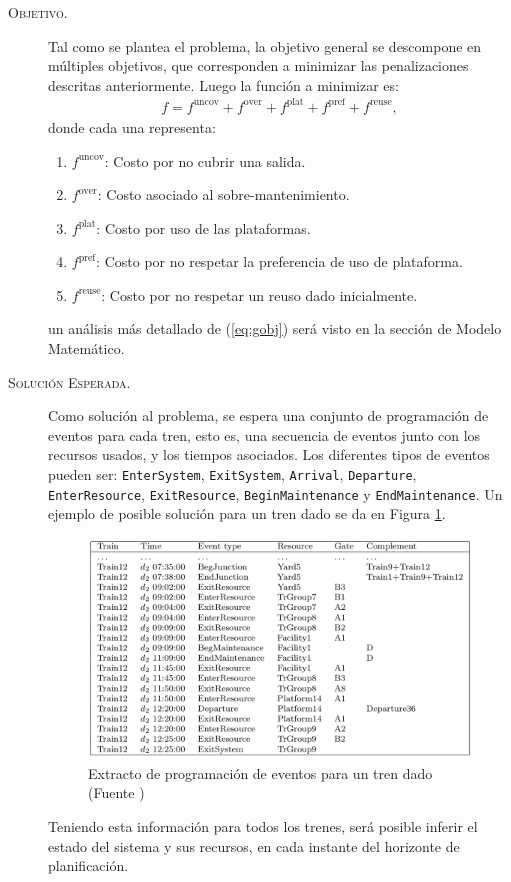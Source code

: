 \documentclass[letter, 10pt]{article}
\begin{document}
\begin{description}
    \item[\textsc{Objetivo.}] Tal como se plantea el problema, la objetivo general se descompone en múltiples objetivos,
    que corresponden a minimizar las penalizaciones descritas anteriormente. Luego la función a minimizar es:
    \begin{align}
        f = f^{\text{uncov}} + f^{\text{over}} + f^{\text{plat}} + f^{\text{pref}} + f^{\text{reuse}},
        \label{eq:gobj}
    \end{align}
    donde cada una representa:
    \begin{enumerate}
        \item $f^{\text{uncov}}$: Costo por no cubrir una salida.
        \item $f^{\text{over}}$: Costo asociado al sobre-mantenimiento.
        \item $f^{\text{plat}}$: Costo por uso de las plataformas.
        \item $f^{\text{pref}}$: Costo por no respetar la preferencia de uso de plataforma.
        \item $f^{\text{reuse}}$: Costo por no respetar un reuso dado inicialmente.
    \end{enumerate}
    un análisis más detallado de (\ref{eq:gobj}) será visto en la sección de Modelo Matemático.
    \item[\textsc{Solución Esperada.}] Como solución al problema, se espera una conjunto de programación de eventos
    para cada tren, esto es, una secuencia de eventos junto con los recursos usados, y los tiempos asociados. Los diferentes tipos de eventos pueden ser: \texttt{EnterSystem}, \texttt{ExitSystem}, \texttt{Arrival}, \texttt{Departure}, \texttt{EnterResource}, \texttt{ExitResource}, \texttt{BeginMaintenance} y \texttt{EndMaintenance}. Un ejemplo de posible solución para un tren dado se da en Figura \ref{fig:sched}.
     \begin{figure}[htpb!]
    \centering
    \includegraphics[width=12cm]{sched}
    \caption{Extracto de programación de eventos para un tren dado (Fuente \cite{Problem})}
    \label{fig:sched}
    \end{figure}
    Teniendo esta información para todos los trenes, será posible inferir el estado del sistema y sus recursos, en cada instante del horizonte de planificación.

\end{description}
\end{document}
